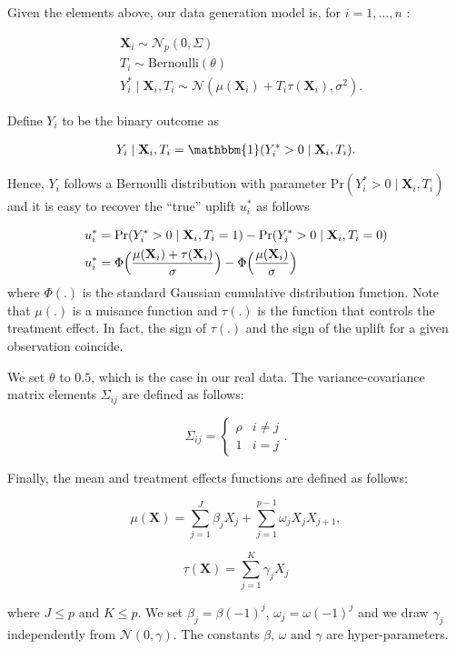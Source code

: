 \documentclass{article}
\def\X{\mathbf X}
\begin{document}
Given the elements above, our data generation model is, for $i=1,...,n$ :

\begin{align*}
    &\X_i \sim \mathcal{N}_p (0, \Sigma) \\
    &T_i \sim \mathrm{Bernoulli}(\theta)\\
    &Y_i^* \mid \X_i, T_i \sim \mathcal{N}(\mu(\X_i) + T_i\tau(\X_i), \sigma^2).
\end{align*}

Define $Y_i$ to be the binary outcome as

\begin{align*}
    Y_i \mid \X_i, T_i = \mathbbm{1}(Y_i^* > 0 \mid \X_i, T_i).
\end{align*}

Hence, $Y_i$ follows a Bernoulli distribution with parameter $\mathrm{Pr}(Y_i^* > 0 \mid \X_i, T_i)$ and it is easy to recover the ``true'' uplift $u_i^*$ as follows

\begin{align*}
    u_i^* &= \mathrm{Pr}(Y_i^* > 0 \mid \X_i, T_i = 1) - \mathrm{Pr}(Y_i^* > 0 \mid \X_i, T_i = 0)\\
    u_i^* &= \Phi \Bigl( \frac{\mu(\X_i) + \tau(\X_i)}{\sigma} \Bigr) - \Phi \Big( \frac{\mu(\X_i)}{\sigma} \Big) 
\end{align*}
where $\Phi(.)$ is the standard Gaussian cumulative distribution function. Note that $\mu(.)$ is a nuisance function and $\tau(.)$ is the function that controls the treatment effect. In fact, the sign of $\tau(.)$ and the sign of the uplift for a given observation coincide.

We set $\theta$ to $0.5$, which is the case in our real data. The variance-covariance matrix elements $\Sigma_{ij}$ are defined as follows:

\[\Sigma_{ij} = \begin{cases} 
      \rho & i\neq j \\
      1 & i=j
   \end{cases}.
\]

Finally, the mean and treatment effects functions are defined as follows:

$$\mu(\X) = \sum_{j=1}^J \beta_j X_j + \sum_{j=1}^{p-1} \omega_j X_j X_{j+1},$$ 


$$\tau(\X) = \sum_{j=1}^K \gamma_j X_j$$

where $J\leq p$ and $K \leq p$. We set $\beta_j = \beta (-1)^{j}$, $\omega_j = \omega (-1)^j$ and we draw $\gamma_j$ independently from $\mathcal{N}(0,\gamma)$. The constants $\beta$, $\omega$ and $\gamma$ are hyper-parameters.
\end{document}
